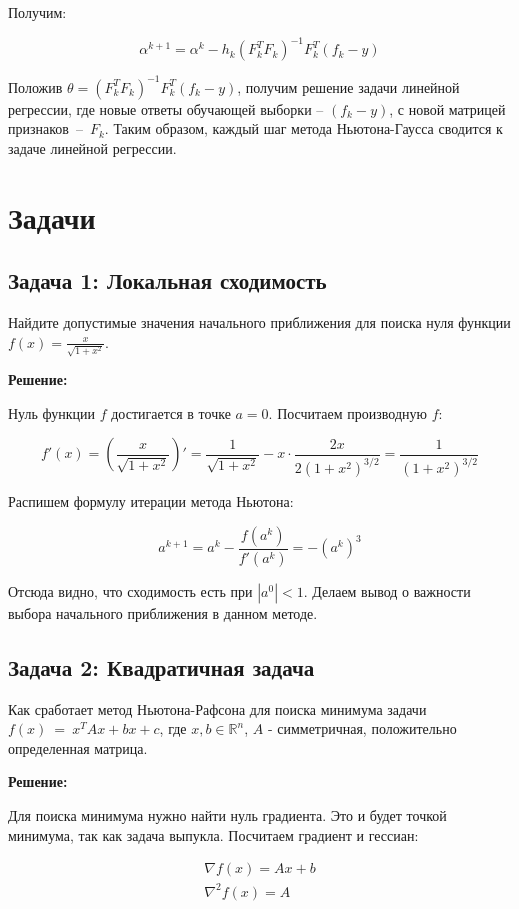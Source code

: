 {Получим:

\[
    \alpha^{k + 1} = \alpha^{k} - h_{k}(F_{k}^{T}F_{k})^{-1}F_{k}^{T}(f_{k} - y)
\]

Положив \( \theta = (F_{k}^{T}F_{k})^{-1}F_{k}^{T}(f_{k} - y) \), получим решение задачи линейной регрессии, где новые ответы обучающей выборки -- \( \left(f_{k} - y \right) \), с новой матрицей признаков~--~\( F_{k} \). Таким образом, каждый шаг метода Ньютона-Гаусса сводится к задаче линейной регрессии.

\section*{Задачи}

\subsection*{Задача 1: Локальная сходимость}

Найдите допустимые значения начального приближения для поиска нуля функции \( f(x) = \frac{x}{\sqrt{1 + x^{2}}} \).

\textbf{Решение:}

Нуль функции \( f \) достигается в точке \( a = 0\). Посчитаем производную \( f \):

\[
    f'(x) = \left(\frac{x}{\sqrt{1 + x^{2}}}\right)' = \frac{1}{\sqrt{1 + x^{2}}} - x\cdot\frac{2x}{2(1 + x^{2})^{3/2}} = \frac{1}{(1 + x^{2})^{3/2}}
\]

Распишем формулу итерации метода Ньютона:

\[
    a^{k + 1} = a^{k} - \frac{f(a^{k})}{f'(a^{k})} = -(a^{k})^3
\]

Отсюда видно, что сходимость есть при \( |a^{0}| < 1 \). Делаем вывод о важности выбора начального приближения в данном методе.

\subsection*{Задача 2: Квадратичная задача}

Как сработает метод Ньютона-Рафсона для поиска минимума задачи \( f(x)~=~x^{T}Ax + bx + c\),  где $x, b \in \mathbb{R}^{n}$, $A$ - симметричная, положительно определенная матрица.

\textbf{Решение:}

Для поиска минимума нужно найти нуль градиента. Это и будет точкой минимума, так как задача выпукла.
Посчитаем градиент и гессиан:

\begin{gather*}
    \nabla f(x) = Ax + b\\[1em]
    \nabla^{2} f(x) = A
\end{gather*}

}
